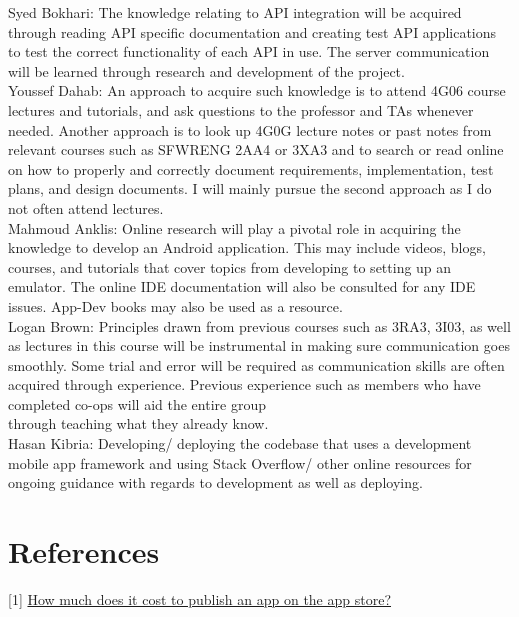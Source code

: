 \documentclass[12pt,letterpaper]{article}
\begin{document}
\noindent Syed Bokhari: The knowledge relating to API integration will be acquired through reading API specific documentation and creating test API applications to test the correct functionality of each API in use. The server communication will be learned through research and development of the project.\\

\noindent Youssef Dahab: An approach to acquire such knowledge is to attend 4G06 course lectures and tutorials, and ask questions to the professor and TAs whenever needed. Another approach is to look up 4G0G lecture notes or past notes from relevant courses such as SFWRENG 2AA4 or 3XA3 and to search or read online on how to properly and correctly document requirements, implementation, test plans, and design documents. I will mainly pursue the second approach as I do not often attend lectures.\\

\noindent Mahmoud Anklis: Online research will play a pivotal role in acquiring the knowledge to develop an Android application. This may include videos, blogs, courses, and tutorials that cover topics from developing to setting up an emulator. The online IDE documentation will also be consulted for any IDE issues. App-Dev books may also be used as a resource.\\

\noindent Logan Brown: Principles drawn from previous courses such as 3RA3, 3I03, as well as lectures in this course will be instrumental in making sure communication goes smoothly. Some trial and error will be required as communication skills are often acquired through experience. Previous experience such as members who have completed co-ops will aid the entire group\\ through teaching what they already know.\\
	
\noindent Hasan Kibria: Developing/ deploying the codebase that uses a development mobile app framework and using Stack Overflow/ other online resources for ongoing guidance with regards to development as well as deploying.\\

\newpage 

\section{References}
[1] \href{https://www.appypie.com/faqs/how-much-does-it-cost-to-publish-an-app-on-the-app-store}{\color{blue}How much does it cost to publish an app on the app store?}
\end{document}
